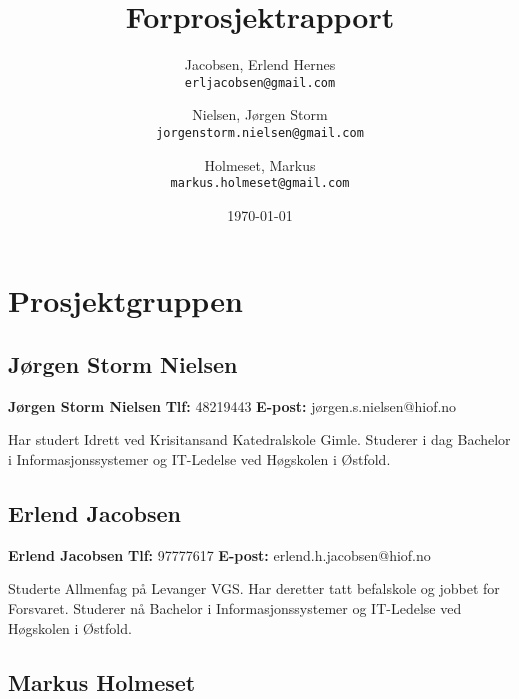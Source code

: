 \documentclass[norsk,a4paper,12pt]{article}
\begin{document}
\author{
	Jacobsen, Erlend Hernes\\
	\texttt{erljacobsen@gmail.com}
	\and
	Nielsen, Jørgen Storm\\
	\texttt{jorgenstorm.nielsen@gmail.com}
	\and
	Holmeset, Markus\\
	\texttt{markus.holmeset@gmail.com}
}
\title{Forprosjektrapport}
\date{\today}
\maketitle

\newpage

\tableofcontents

\newpage

\section{Prosjektgruppen}

\subsection{Jørgen Storm Nielsen}

\textbf{Jørgen Storm Nielsen}\newline
\textbf{Tlf:} 48219443\newline
\textbf{E-post:} jørgen.s.nielsen@hiof.no\newline

Har studert Idrett ved Krisitansand Katedralskole Gimle. Studerer i dag Bachelor i Informasjonssystemer og IT-Ledelse ved Høgskolen i Østfold.

\subsection{Erlend Jacobsen}

\textbf{Erlend Jacobsen}\newline
\textbf{Tlf:} 97777617\newline
\textbf{E-post:} erlend.h.jacobsen@hiof.no\newline

Studerte Allmenfag på Levanger VGS. Har deretter tatt befalskole og jobbet for Forsvaret. Studerer nå Bachelor i Informasjonssystemer og IT-Ledelse ved Høgskolen i Østfold.

\subsection{Markus Holmeset}
\end{document}

